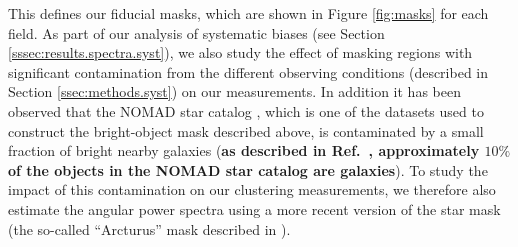 \documentclass[a4paper,11pt]{article}
\newcommand{\rev}[1]{{\textbf{#1}}}
\begin{document}
    This defines our fiducial masks, which are shown in Figure \ref{fig:masks} for each field. As part of our analysis of systematic biases (see Section \ref{sssec:results.spectra.syst}), we also study the effect of masking regions with significant contamination from the different observing conditions (described in Section \ref{ssec:methods.syst}) on our measurements. In addition it has been observed that the NOMAD star catalog \cite{2004AAS...205.4815Z}, which is one of the datasets used to construct the bright-object mask described above, is contaminated by a small fraction of bright nearby galaxies (\rev{as described in Ref.~\cite{2018PASJ...70S..25M}, approximately $10\%$ of the objects in the NOMAD star catalog are galaxies}). To study the impact of this contamination on our clustering measurements, we therefore also estimate the angular power spectra using a more recent version of the star mask (the so-called ``Arcturus'' mask described in \cite{2018PASJ...70S...7C}).
\end{document}
